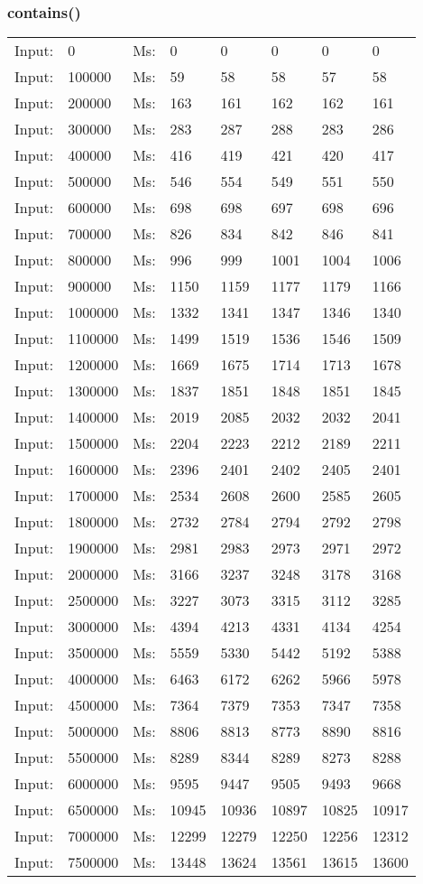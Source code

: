 \documentclass[11pt,a4paper]{report}
\begin{document}
\begin{tiny}
\subsubsection*{contains()}
\begin{tabular}{l l ||l  l  l  l  l  l}
Input:&0&Ms:&0&0&0&0&0\\
Input:&100000&Ms:&59&58&58&57&58\\
Input:&200000&Ms:&163&161&162&162&161\\
Input:&300000&Ms:&283&287&288&283&286\\
Input:&400000&Ms:&416&419&421&420&417\\
Input:&500000&Ms:&546&554&549&551&550\\
Input:&600000&Ms:&698&698&697&698&696\\
Input:&700000&Ms:&826&834&842&846&841\\
Input:&800000&Ms:&996&999&1001&1004&1006\\
Input:&900000&Ms:&1150&1159&1177&1179&1166\\
Input:&1000000&Ms:&1332&1341&1347&1346&1340\\
Input:&1100000&Ms:&1499&1519&1536&1546&1509\\
Input:&1200000&Ms:&1669&1675&1714&1713&1678\\
Input:&1300000&Ms:&1837&1851&1848&1851&1845\\
Input:&1400000&Ms:&2019&2085&2032&2032&2041\\
Input:&1500000&Ms:&2204&2223&2212&2189&2211\\
Input:&1600000&Ms:&2396&2401&2402&2405&2401\\
Input:&1700000&Ms:&2534&2608&2600&2585&2605\\
Input:&1800000&Ms:&2732&2784&2794&2792&2798\\
Input:&1900000&Ms:&2981&2983&2973&2971&2972\\
Input:&2000000&Ms:&3166&3237&3248&3178&3168\\
Input:&2500000&Ms:&3227&3073&3315&3112&3285\\
Input:&3000000&Ms:&4394&4213&4331&4134&4254\\
Input:&3500000&Ms:&5559&5330&5442&5192&5388\\
Input:&4000000&Ms:&6463&6172&6262&5966&5978\\
Input:&4500000&Ms:&7364&7379&7353&7347&7358\\
Input:&5000000&Ms:&8806&8813&8773&8890&8816\\
Input:&5500000&Ms:&8289&8344&8289&8273&8288\\
Input:&6000000&Ms:&9595&9447&9505&9493&9668\\
Input:&6500000&Ms:&10945&10936&10897&10825&10917\\
Input:&7000000&Ms:&12299&12279&12250&12256&12312\\
Input:&7500000&Ms:&13448&13624&13561&13615&13600\\
\end{tabular}


\end{tiny}
\end{document}
